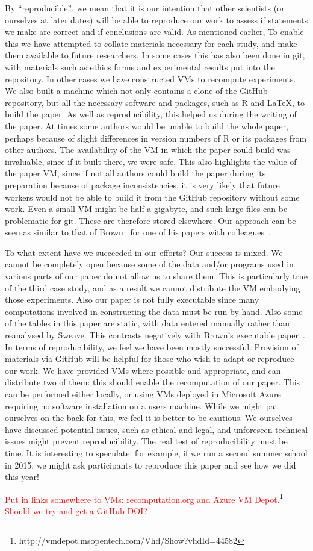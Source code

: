 By ``reproducible'', we mean that it is our intention that other scientists (or
ourselves at later dates) will be able to reproduce our work to assess if
statements we make are correct and if conclusions are valid.  
As mentioned earlier, 
To enable this we
have attempted to collate materials necessary for each study, and make them
available to future researchers.  
In some cases this has also been done in git,
with materials such as ethics forms and experimental results put into the repository.  
In other cases we have constructed VMs to recompute experiments.  
We also built a machine which not only contains a clone of the GitHub repository, but all the necessary software and packages, such as R and \LaTeX, to build the paper.
As well as reproducibility, this helped us during the writing of the paper.  At times some authors would be unable to build the whole paper, perhaps because of slight differences in version numbers of R or its packages from other authors.  The availability of the VM in which the paper could build was invaluable, since if it built there, we were safe.  This also highlights the value of the paper VM, since if not all authors could build the paper during its preparation because of package inconsistencies, it is very likely that future workers would not be able to build it from the GitHub repository without some work.
Even a small VM 
might be half a gigabyte, and such large files can be problematic for git.
These are therefore stored elsewhere.  
Our approach can be seen as similar to that of Brown~\cite{brown} for one of his papers with colleagues~\cite{Brown2012}.


To what extent have we succeeded in our efforts?
Our success is mixed.  We cannot be completely open because
some of the data and/or programs used in various parts of our paper do not allow us to share them.  This is particularly true of the third case study, and as a result we cannot distribute the VM embodying those experiments. Also our paper is not fully executable since 
many computations involved in constructing the data must be run by hand.  Also some of the tables in this paper are static, with data entered manually rather than reanalysed by Sweave. This contrasts negatively with Brown's executable paper~\cite{brown}.  
In terms of reproducibility, we feel we have been mostly successful.  
Provision of materials via GitHub will be helpful for those who wish to adapt or reproduce our work.
We have provided VMs where possible and appropriate, and can distribute two of them: this should enable the recomputation of our paper.  This can be performed either locally, or using VMs deployed in Microsoft Azure requiring no software installation on a users machine. 
While we might pat ourselves on the back for this, we feel it is better to be cautious. We ourselves have discussed potential issues, such as ethical and legal, and unforeseen technical issues might prevent reproducibility. The real test of reproducibility must be time.
It is interesting to speculate: for example, if we run a second summer school in 2015, we might ask participants to reproduce this paper and see how we did this year!

\textcolor{red}{Put in links somewhere to VMs: recomputation.org and Azure VM Depot.\footnote{http://vmdepot.msopentech.com/Vhd/Show?vhdId=44582} Should we try and get a GitHub DOI?}


